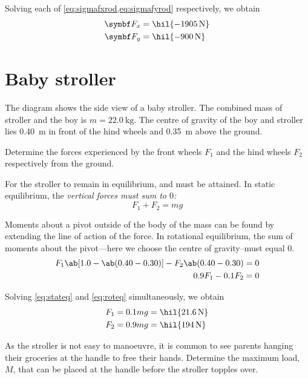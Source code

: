 Solving each of \cref{eq:sigmafxrod,eq:sigmafyrod} respectively, we obtain
\begin{align*}
  \mv{F}_x &= \hil{\qty{-1905}{\newton}} \\
  \mv{F}_y &= \hil{\qty{-900}{\newton}}
\end{align*}

\section{Baby stroller}
\begin{problem}
  The diagram shows the side view of a baby stroller. The combined
  mass of stroller and the boy is \(m = \qty{22.0}{\kilo\gram}\). The centre
  of gravity of the boy and stroller lies \qty{0.40}{\metre} in front
  of the hind wheels
  and \qty{0.35}{\metre} above the ground.

  Determine the forces experienced by the front wheels \(F_1\) and
  the hind wheels
  \(F_2\) respectively from the ground.
\end{problem}

For the stroller to remain in equilibrium, 
and 
must be attained. In static equilibrium, the \it{vertical} forces
must sum to \(0\):
\begin{equation}
  F_1 + F_2 = mg
  \label{eq:stateq}
\end{equation}

Moments about a pivot outside of the body of the mass can be found by
extending the line of action
of the force. In {rotational equilibrium}, the sum of moments about
the pivot---here we choose
the centre of gravity--must equal \(0\).
\begin{align}
  F_1\ab[1.0-\ab(0.40-0.30)] - F_2\ab(0.40-0.30)&=0 \\
  0.9F_1 - 0.1F_2&=0
  \label{eq:roteq}
\end{align}

Solving \cref{eq:stateq} and \cref{eq:roteq} simultaneously, we obtain
\begin{align*}
  F_1 &= 0.1mg = \hil{\qty{21.6}{\newton}} \\
  F_2 &= 0.9mg = \hil{\qty{194}{\newton}}
\end{align*}

\begin{problem}
  As the stroller is not easy to manoeuvre, it is common to see parents
  hanging their groceries at the handle to free their hands.
  Determine the maximum load, \(M\), that can be placed at the handle
  before the stroller topples over.
\end{problem}

